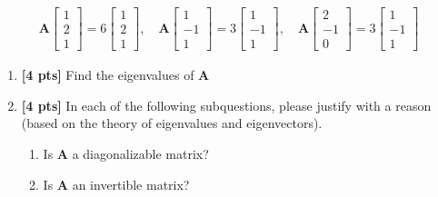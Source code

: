 \documentclass[11pt,addpoints,answers]{exam}
\numberwithin{equation}{section} %
\numberwithin{figure}{section} %
\numberwithin{table}{section} %
\begin{document}
\begin{questions}
    \begin{align*}
    \mathbf{A} \begin{bmatrix}
        1 \\2 \\1
    \end{bmatrix} = 6\begin{bmatrix}
        1 \\ 2 \\1
    \end{bmatrix}, \quad \mathbf{A}\begin{bmatrix}
        1 \\ -1 \\ 1
    \end{bmatrix} = 3 \begin{bmatrix}
        1 \\ -1 \\ 1
    \end{bmatrix}, \quad \mathbf{A} \begin{bmatrix}
        2 \\ -1 \\ 0
    \end{bmatrix} = 3 \begin{bmatrix}
        1 \\ -1 \\ 1
    \end{bmatrix}
    \end{align*}
    \begin{enumerate}[label=\Roman*]
        \item \textbf{[4 pts]} Find the eigenvalues of $\mathbf{A}$
        \item \textbf{[4 pts]} In each of the following subquestions, please justify with a reason (based on the theory of eigenvalues and eigenvectors).
        \begin{enumerate}
            \item Is $\mathbf{A}$ a diagonalizable matrix?
            \item Is $\mathbf{A}$ an invertible matrix?
        \end{enumerate}

    \end{enumerate}
    \begin{tcolorbox}[fit,height=3cm, width=\textwidth, blank, borderline={0.5pt}{-2pt},halign=center, valign=center, nobeforeafter]
    \end{tcolorbox}     
    
\end{questions}
\end{document}
